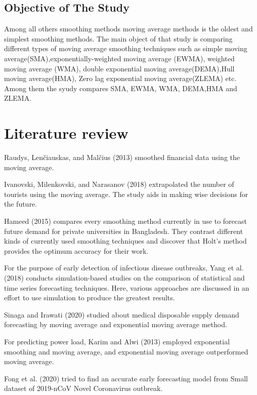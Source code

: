 \documentclass{article}
\begin{document}
\hypertarget{objective-of-the-study}{%
\subsection{Objective of The Study}\label{objective-of-the-study}}

Among all others smoothing methods moving average methods is the oldest
and simplest smoothing methods. The main object of that study is
comparing different types of moving average smoothing techniques such as
simple moving average(SMA),exponentially-weighted moving average (EWMA),
weighted moving average (WMA), double exponential moving
average(DEMA),Hull moving average(HMA), Zero lag exponential moving
average(ZLEMA) etc. Among them the syudy compares SMA, EWMA, WMA,
DEMA,HMA and ZLEMA.

\hypertarget{literature-review}{%
\section{Literature review}\label{literature-review}}

Raudys, Lenčiauskas, and Malčius (2013) smoothed financial data using
the moving average.

Ivanovski, Milenkovski, and Narasanov (2018) extrapolated the number of
tourists using the moving average. The study aids in making wise
decisions for the future.

Hameed (2015) compares every smoothing method currently in use to
forecast future demand for private universities in Bangladesh. They
contrast different kinds of currently used smoothing techniques and
discover that Holt's method provides the optimum accuracy for their
work.

For the purpose of early detection of infectious disease outbreaks, Yang
et al. (2018) conducts simulation-based studies on the comparison of
statistical and time series forecasting techniques. Here, various
approaches are discussed in an effort to use simulation to produce the
greatest results.

Sinaga and Irawati (2020) studied about medical disposable supply demand
forecasting by moving average and exponential moving average method.

For predicting power load, Karim and Alwi (2013) employed exponential
smoothing and moving average, and exponential moving average
outperformed moving average.

Fong et al. (2020) tried to find an accurate early forecasting model
from Small dataset of 2019-nCoV Novel Coronavirus outbreak.
\end{document}
